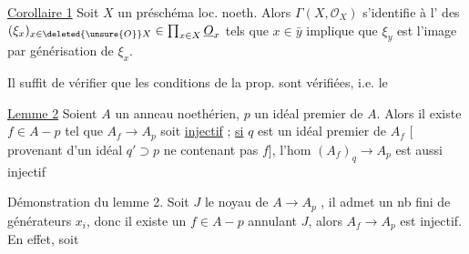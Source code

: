 \uline{Corollaire 1} Soit $X$ un préschéma loc. noeth. Alors
$\Gamma(X,\mathcal O_{X})$ s'identifie à l' des $(\xi_x)_{x\in\deleted{\unsure{O}}X}\in\prod_{x\in X}\underline{O}_x$ tels que $x\in\bar{y}$ implique que $\xi_y$ est l'image par générisation de $\xi_x$.

Il suffit de vérifier que les conditions de la prop. sont vérifiées, i.e.  le

\uline{Lemme 2} Soient $A$ un anneau noethérien, $p$ un idéal premier de $A$. Alors il existe $f\in A-p$ tel que $A_f\to A_p$ soit \uline{injectif} ;
\uline{si}   $q$ est un idéal premier de $A_f$  [ provenant d'un idéal $q'\supset p$ ne contenant pas $f$],  l'hom $(A_f)_q\to A_p$ est aussi injectif

Démonstration du lemme 2. Soit $J$ le noyau de $A\to A_p$ , il admet un nb fini de générateurs $x_i$, donc il existe un $f\in A-p$ annulant $J$,   alors $A_f\to A_p$ est injectif. En effet, soit    
